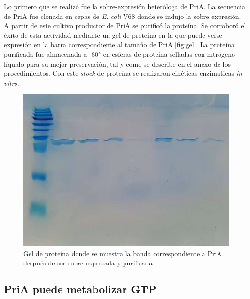 \documentclass[12pt,twoside]{reedthesis}
\begin{document}
  Lo primero que se realizó fue la sobre-expresión heteróloga de PriA. La
  secuencia de PriA fue clonada en cepas de \emph{E. coli} V68 donde se
  indujo la sobre expresión. A partir de este cultivo productor de PriA se
  purificó la proteína. Se corroboró el éxito de esta actividad mediante
  un gel de proteína en la que puede verse expresión en la barra
  correspondiente al tamaño de PriA \autoref{fig:gel}. La proteína
  purificada fue almacenada a -80° en esferas de proteína selladas con
  nitrógeno líquido para su mejor preservación, tal y como se describe en
  el anexo de los procedimientos. Con este \emph{stock} de proteína se
  realizaron cinéticas enzimáticas \emph{in vitro}.
  
  \begin{figure}[h!tbp]
  \centering
  \includegraphics[angle = 0,scale = 0.6]{chapter4/Geles/PriAAbril30.png}
  \caption[gel]{\footnotesize{Gel de proteína donde se muestra la banda correspondiente a PriA después de ser sobre-expresada y purificada}}
  \label{fig:gel}
  \end{figure}
  
  \subsection{PriA puede metabolizar
  GTP}\label{pria-puede-metabolizar-gtp}
  
\end{document}
